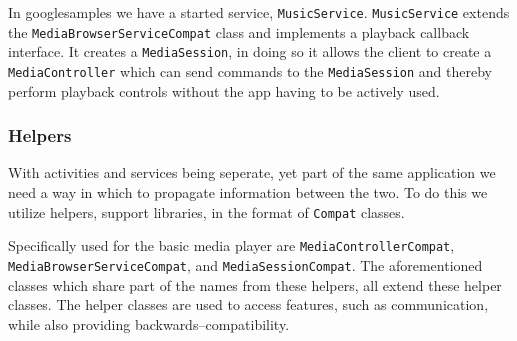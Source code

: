 In googlesamples we have a started service, \texttt{MusicService}.
\texttt{MusicService} extends the \texttt{MediaBrowserServiceCompat} class and implements a playback callback interface.
It creates a \texttt{MediaSession}, in doing so it allows the client to create a \texttt{MediaController} which can send commands to the \texttt{MediaSession} and thereby perform playback controls without the app having to be actively used.


\subsubsection{Helpers}
With activities and services being seperate, yet part of the same application we need a way in which to propagate information between the two.
To do this we utilize helpers, support libraries, in the format of \texttt{Compat} classes.

Specifically used for the basic media player are \texttt{MediaControllerCompat}, \texttt{MediaBrowserServiceCompat}, and \texttt{MediaSessionCompat}.
The aforementioned classes which share part of the names from these helpers, all extend these helper classes.
The helper classes are used to access features, such as communication, while also providing backwards--compatibility.





